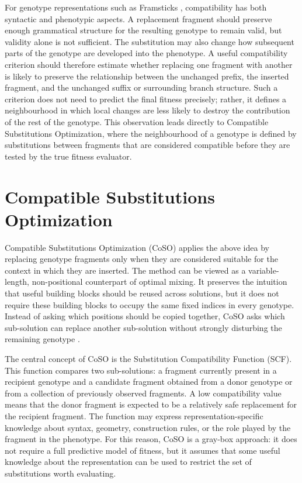 For genotype representations such as Framsticks \fone{}, compatibility has both syntactic and phenotypic aspects. A replacement fragment should preserve enough grammatical structure for the resulting genotype to remain valid, but validity alone is not sufficient. The substitution may also change how subsequent parts of the genotype are developed into the phenotype. A useful compatibility criterion should therefore estimate whether replacing one fragment with another is likely to preserve the relationship between the unchanged prefix, the inserted fragment, and the unchanged suffix or surrounding branch structure. Such a criterion does not need to predict the final fitness precisely; rather, it defines a neighbourhood in which local changes are less likely to destroy the contribution of the rest of the genotype. This observation leads directly to Compatible Substitutions Optimization, where the neighbourhood of a genotype is defined by substitutions between fragments that are considered compatible before they are tested by the true fitness evaluator.

\section{Compatible Substitutions Optimization}

Compatible Substitutions Optimization (CoSO) applies the above idea by replacing genotype fragments only when they are considered suitable for the context in which they are inserted. The method can be viewed as a variable-length, non-positional counterpart of optimal mixing. It preserves the intuition that useful building blocks should be reused across solutions, but it does not require these building blocks to occupy the same fixed indices in every genotype. Instead of asking which positions should be copied together, CoSO asks which sub-solution can replace another sub-solution without strongly disturbing the remaining genotype \cite{KomosinskiMiazga2025}.

The central concept of CoSO is the Substitution Compatibility Function (SCF). This function compares two sub-solutions: a fragment currently present in a recipient genotype and a candidate fragment obtained from a donor genotype or from a collection of previously observed fragments. A low compatibility value means that the donor fragment is expected to be a relatively safe replacement for the recipient fragment. The function may express representation-specific knowledge about syntax, geometry, construction rules, or the role played by the fragment in the phenotype. For this reason, CoSO is a gray-box approach: it does not require a full predictive model of fitness, but it assumes that some useful knowledge about the representation can be used to restrict the set of substitutions worth evaluating.

